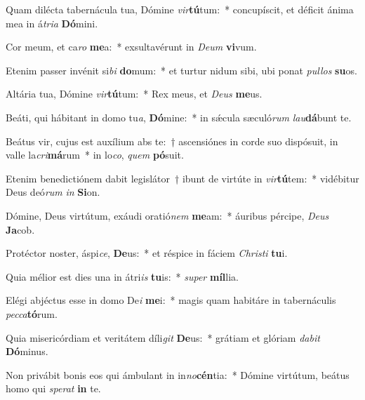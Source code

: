 \item Quam dilécta tabernácula tua, Dómine \textit{vir}\textbf{tú}tum:~* concupíscit, et déficit ánima mea in á\textit{tri}\textit{a} \textbf{Dó}mini.
\item Cor meum, et ca\textit{ro} \textbf{me}a:~* exsultavérunt in \textit{De}\textit{um} \textbf{vi}vum.
\item Etenim passer invénit si\textit{bi} \textbf{do}mum:~* et turtur nidum sibi, ubi ponat \textit{pul}\textit{los} \textbf{su}os.
\item Altária tua, Dómine \textit{vir}\textbf{tú}tum:~* Rex meus, et \textit{De}\textit{us} \textbf{me}us.
\item Beáti, qui hábitant in domo tu\textit{a}, \textbf{Dó}mine:~* in sǽcula sæculó\textit{rum} \textit{lau}\textbf{dá}bunt te.
\item Beátus vir, cujus est auxílium abs te:~† ascensiónes in corde suo dispósuit, in valle la\textit{cri}\textbf{má}rum~* in lo\textit{co}, \textit{quem} \textbf{pó}suit.
\item Etenim benedictiónem dabit legislátor~† ibunt de virtúte in \textit{vir}\textbf{tú}tem:~* vidébitur Deus deó\textit{rum} \textit{in} \textbf{Si}on.
\item Dómine, Deus virtútum, exáudi oratió\textit{nem} \textbf{me}am:~* áuribus pércipe, \textit{De}\textit{us} \textbf{Ja}cob.
\item Protéctor noster, áspi\textit{ce}, \textbf{De}us:~* et réspice in fáciem \textit{Chris}\textit{ti} \textbf{tu}i.
\item Quia mélior est dies una in átri\textit{is} \textbf{tu}is:~* \textit{su}\textit{per} \textbf{míl}lia.
\item Elégi abjéctus esse in domo De\textit{i} \textbf{me}i:~* magis quam habitáre in tabernáculis \textit{pec}\textit{ca}\textbf{tó}rum.
\item Quia misericórdiam et veritátem díli\textit{git} \textbf{De}us:~* grátiam et glóriam \textit{da}\textit{bit} \textbf{Dó}minus.
\item Non privábit bonis eos qui ámbulant in in\textit{no}\textbf{cén}tia:~* Dómine virtútum, beátus homo qui \textit{spe}\textit{rat} \textbf{in} te.
